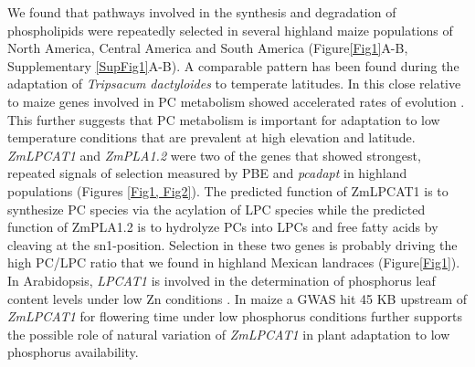 \documentclass[9pt,twocolumn,twoside,lineno]{BioRxiv}
\begin{document}
We found that pathways involved in the synthesis and degradation of phospholipids were repeatedly selected in several highland maize populations of North America, Central America and South America (Figure\ref{Fig1}A-B, Supplementary \ref{SupFig1}A-B). 
A comparable pattern has been found during the adaptation of \textit{Tripsacum dactyloides} to temperate latitudes. 
In this close relative to maize genes involved in PC metabolism showed accelerated rates of evolution \cite{Yan2019-tx}.
This further suggests that PC metabolism is important for adaptation to low temperature conditions that are prevalent at high elevation and latitude. 
\textit{ZmLPCAT1} and \textit{ZmPLA1.2} were two of the genes that showed strongest, repeated signals of selection measured by PBE and \textit{pcadapt} in highland populations (Figures \ref{Fig1, Fig2}). 
The predicted function of ZmLPCAT1 is to synthesize PC species via the acylation of LPC species while the predicted function of ZmPLA1.2 is to hydrolyze PCs into LPCs and free fatty acids by cleaving at the sn1-position.
Selection in these two genes is probably driving the high PC/LPC ratio that we found in highland Mexican landraces (Figure\ref{Fig1}).
In Arabidopsis, \textit{LPCAT1} is involved in the determination of phosphorus leaf content levels under low Zn conditions \cite{Kisko2018-zm}.
In maize a GWAS hit 45 KB upstream of \textit{ZmLPCAT1} for flowering time under low phosphorus conditions further supports the possible role of natural variation of \textit{ZmLPCAT1} in plant adaptation to low phosphorus availability. 
\end{document}
